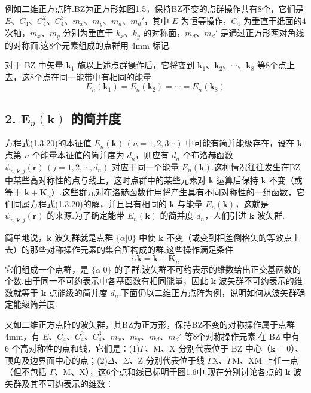 例如二维正方点阵.BZ为正方形如图1.5，保持BZ不变的点群操作共有8个，它们是 $E$、$C_4$、$C_4^2$、$C_4^3$、$m_x$、$m_y$、$m_d$、$m_d'$，其中 $E$ 为恒等操作，$C_4$ 为垂直于纸面的4次轴，$m_x$、$m_y$ 分别为垂直于 $k_x$、$k_y$ 的对称面，$m_d$、$m_d'$ 是通过正方形两对角线的对称面.这8个元素组成的点群用 4mm 标记.

对于 BZ 中矢量 $\boldsymbol{k}_1$ 施以上述点群操作后，它将变到 $\boldsymbol{k}_1$、$\boldsymbol{k}_2$、$\cdots$、$\boldsymbol{k}_8$ 等8个点上去，这8个点在同一能带中有相同的能量
\begin{equation*}
  E_n(\boldsymbol{k}_1)=E_n(\boldsymbol{k}_2)=\cdots=E_n(\boldsymbol{k}_8)
\end{equation*}

\subsection*{2. $\boldsymbol{E}_n(\boldsymbol{k})$ 的简并度}

方程式(1.3.20)的本征值 $E_n(\boldsymbol{k})\,(n=1,2,3\cdots)$ 中可能有简并能级存在，设在 $\boldsymbol{k}$ 点第 $n$ 个能量本征值的简并度为 $d_n$，则应有 $d_n$ 个布洛赫函数 $\psi_{n,\boldsymbol{k},j}(\boldsymbol{r})\,(j=1,2,\cdots,d_n)$ 对应于同一个能量 $E_n(\boldsymbol{k})$.这种情况往往发生在BZ中某些高对称性的点与线上，这时点群中的某些元素对 $\boldsymbol{k}$ 运算后保持 $\boldsymbol{k}$ 不变（或等于 $\boldsymbol{k}+\boldsymbol{K}_n$）.这些群元对布洛赫函数作用将产生具有不同对称性的一组函数，它们同属方程式(1.3.20)的解，并且具有相同的 $\boldsymbol{k}$ 与能量 $E_n(\boldsymbol{k})$，这就是 $\psi_{n,\boldsymbol{k},j}(\boldsymbol{r})$ 的来源.为了确定能带 $E_n(\boldsymbol{k})$ 的简并度 $d_n$，人们引进 $\boldsymbol{k}$ 波矢群.

简单地说，$\boldsymbol{k}$ 波矢群就是点群 $\{\alpha|0\}$ 中使 $\boldsymbol{k}$ 不变（或变到相差倒格矢的等效点上去）的那些对称操作元素的集合所构成的群.这些操作满足条件
\begin{equation}
  \alpha\boldsymbol{k}=\boldsymbol{k}+\boldsymbol{K}_n
\end{equation}
它们组成一个点群，是 $\{\alpha|0\}$ 的子群.波矢群不可约表示的维数给出正交基函数的个数.由于同一不可约表示中各基函数有相同能量，因此 $\boldsymbol{k}$ 波矢群不可约表示的维数就等于 $\boldsymbol{k}$ 点能级的简并度 $d_n$.下面仍以二维正方点阵为例，说明如何从波矢群确定能级简并度.

又如二维正方点阵的波矢群，其BZ为正方形，保持BZ不变的对称操作属于点群 4mm，有 $E$、$C_4$、$C_4^2$、$C_4^3$、$m_x$、$m_y$、$m_d$、$m_d'$ 等8个对称操作元素.在 BZ 中有 6 个高对称性的点和线，它们是：(1)$\Gamma$、M、X 分别代表位于 BZ 中心（$\boldsymbol{k}=0$）、顶角及边界面中心的点；(2)$\Delta$、$\Sigma$、Z 分别代表位于线 $\Gamma$X、$\Gamma$M、XM 上任一点（但不包括 $\Gamma$、M、X），这6个点和线已标明于图1.6中.现在分别讨论各点的 $\boldsymbol{k}$ 波矢群及其不可约表示的维数：

